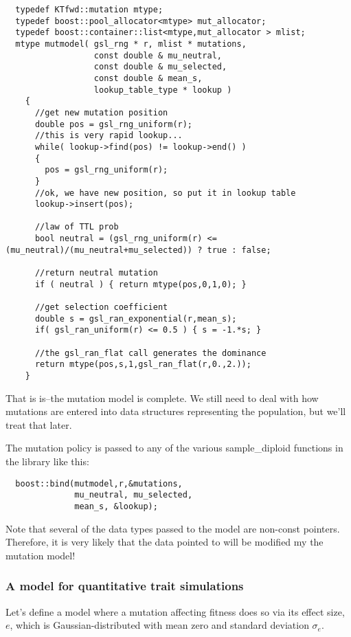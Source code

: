 \documentclass{article}
\begin{document}
\begin{lstlisting}
  typedef KTfwd::mutation mtype;
  typedef boost::pool_allocator<mtype> mut_allocator;
  typedef boost::container::list<mtype,mut_allocator > mlist;
  mtype mutmodel( gsl_rng * r, mlist * mutations,
                  const double & mu_neutral,
                  const double & mu_selected,
                  const double & mean_s,
                  lookup_table_type * lookup )
    {
      //get new mutation position
      double pos = gsl_rng_uniform(r);
      //this is very rapid lookup...
      while( lookup->find(pos) != lookup->end() )
      {
        pos = gsl_rng_uniform(r);
      }
      //ok, we have new position, so put it in lookup table
      lookup->insert(pos);

      //law of TTL prob
      bool neutral = (gsl_rng_uniform(r) <= (mu_neutral)/(mu_neutral+mu_selected)) ? true : false;

      //return neutral mutation
      if ( neutral ) { return mtype(pos,0,1,0); }

      //get selection coefficient
      double s = gsl_ran_exponential(r,mean_s);
      if( gsl_ran_uniform(r) <= 0.5 ) { s = -1.*s; }

      //the gsl_ran_flat call generates the dominance
      return mtype(pos,s,1,gsl_ran_flat(r,0.,2.));
    }
\end{lstlisting}

That is is--the mutation model is complete.  We still need to deal with how mutations are entered into data structures representing the population, but we'll treat that later.

The mutation policy is passed to any of the various sample\_diploid functions in the library like this:

\begin{lstlisting}
  boost::bind(mutmodel,r,&mutations,
              mu_neutral, mu_selected,
              mean_s, &lookup);
\end{lstlisting}

Note that several of the data types passed to the model are non-const pointers.  Therefore, it is very likely that the data pointed to will be modified my the mutation model!

\subsubsection{A model for quantitative trait simulations}
Let's define a model where a mutation affecting fitness does so via its effect size, $e$, which is Gaussian-distributed with mean zero and standard deviation $\sigma_e$.
\end{document}
